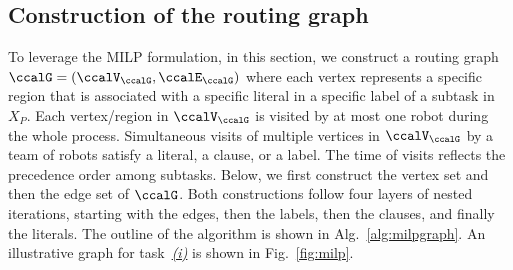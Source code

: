 \documentclass[Afour,sageh,times]{sagej}
\begin{document}
\subsection{Construction of the routing graph}\label{sec:graph}
To leverage the MILP formulation, in this section, we construct a routing graph $\ccalG = (\ccalV_{\ccalG},\ccalE_{\ccalG})$ where each vertex represents a specific region that is associated with a specific literal in a specific label of a subtask in $X_P$. Each vertex/region in $\ccalV_\ccalG$ is visited by at most one robot during the whole process. Simultaneous visits of multiple vertices in $\ccalV_\ccalG$ by a team of robots  satisfy a literal, a clause, or a label. The time of visits reflects the precedence order among subtasks. Below, we first construct  the vertex set and then the edge set of $\ccalG$. Both constructions follow four layers of nested iterations, starting with the edges, then the labels, then the clauses, and finally the literals. The outline of the algorithm is shown in Alg.~\ref{alg:milpgraph}. An illustrative graph for task~\hyperref[task:i]{\it (i)}  is shown in Fig.~\ref{fig:milp}.
\end{document}
